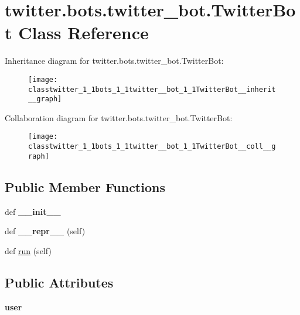 \hypertarget{classtwitter_1_1bots_1_1twitter__bot_1_1TwitterBot}{}\section{twitter.\+bots.\+twitter\+\_\+bot.\+Twitter\+Bot Class Reference}
\label{classtwitter_1_1bots_1_1twitter__bot_1_1TwitterBot}


Inheritance diagram for twitter.\+bots.\+twitter\+\_\+bot.\+Twitter\+Bot\+:\nopagebreak
\begin{figure}[H]
\begin{center}
\leavevmode
\texttt{[image: classtwitter\_1\_1bots\_1\_1twitter\_\_bot\_1\_1TwitterBot\_\_inherit\_\_graph]}
\end{center}
\end{figure}


Collaboration diagram for twitter.\+bots.\+twitter\+\_\+bot.\+Twitter\+Bot\+:\nopagebreak
\begin{figure}[H]
\begin{center}
\leavevmode
\texttt{[image: classtwitter\_1\_1bots\_1\_1twitter\_\_bot\_1\_1TwitterBot\_\_coll\_\_graph]}
\end{center}
\end{figure}
\subsection*{Public Member Functions}
\begin{DoxyCompactItemize}
\item 
\mbox{\label{classtwitter_1_1bots_1_1twitter__bot_1_1TwitterBot_a19e4ba96300342dd63980717852a30b3}} 
def {\bfseries \+\_\+\+\_\+init\+\_\+\+\_\+}
\item 
\mbox{\label{classtwitter_1_1bots_1_1twitter__bot_1_1TwitterBot_a599499bf98dd54aeb95938c18086477f}} 
def {\bfseries \+\_\+\+\_\+repr\+\_\+\+\_\+} (self)
\item 
def \hyperlink{classtwitter_1_1bots_1_1twitter__bot_1_1TwitterBot_aa0425e1810fa53dab90ca0e9d7b973d1}{run} (self)
\end{DoxyCompactItemize}
\subsection*{Public Attributes}
\begin{DoxyCompactItemize}
\item 
\mbox{\label{classtwitter_1_1bots_1_1twitter__bot_1_1TwitterBot_af7ed1ab8062dc7e29dbf8ced90b6ca3c}} 
{\bfseries user}
\end{DoxyCompactItemize}


